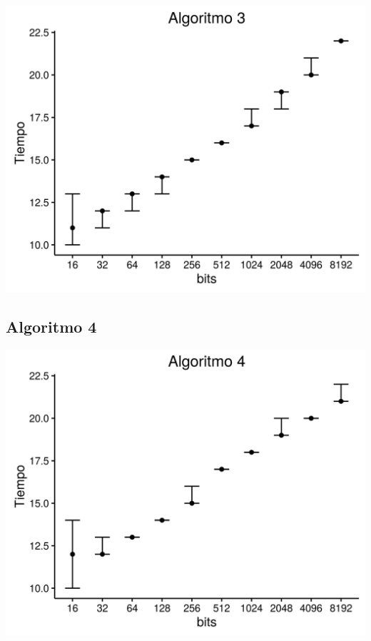 \documentclass[12pt,letterpaper]{scrartcl}
\begin{document}
\begin{center}
	\includegraphics[scale=1]{plot/a3.png}
\end{center}	

\newpage


\subsection{Algoritmo 4}

\begin{center}
	\includegraphics[scale=1]{plot/a4.png}
\end{center}	
\end{document}
